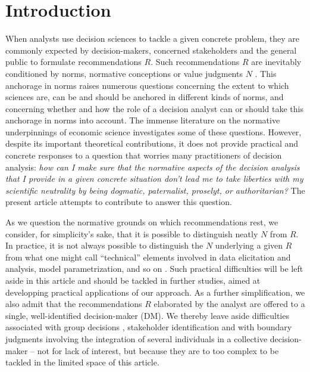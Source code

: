 \documentclass[preprint, french, english, 11pt, authoryear]{elsarticle}%
\begin{document}
\section{Introduction}
When analysts use decision sciences to tackle a given concrete problem, they are commonly expected by decision-makers, concerned stakeholders and the general public to formulate recommendations $R$. 
Such recommendations $R$ are inevitably conditioned by norms, normative conceptions or value judgments $N$ \citep{funtowicz_science_1993,brans_ethics_2002,mingers_ethics_2011,ormerod_operational_2013,diekmann_moral_2013}. This anchorage in norms raises numerous questions concerning the extent to which sciences are, can be and should be anchored in different kinds of norms, and concerning whether and how the role of a decision analyst can or should take this anchorage in norms into account. The immense literature on the normative underpinnings of economic science \citep{buchanan_positive_1959, sen_nature_1967, dwyer_scientific_1985, heath_value_1994, sen_rationality_2004, mongin_value_2006, sen_idea_2009, baujard_value_2013} investigates some of these questions. %
However, despite its important theoretical contributions, it does not provide practical and concrete responses to a question that worries many practitioners of decision analysis: \emph{how can I make sure that the normative aspects of the decision analysis that I provide in a given concrete situation don't lead me to take liberties with my scientific neutrality by being dogmatic, paternalist, proselyt, or authoritarian?}
The present article attempts to contribute to answer this question. 

As we question the normative grounds on which recommendations rest, we consider, for simplicity's sake, that it is possible to distinguish neatly $N$ from $R$. In practice, it is not always possible to distinguish the $N$ underlying a given $R$ from what one might call ``technical'' elements involved in data elicitation and analysis, model parametrization, and so on \citep{baujard_value_2013}. Such practical difficulties will be left aside in this article and should be tackled in further studies, aimed at developping practical applications of our approach. As a further simplification, we also admit that the recommendations $R$ elaborated by the analyst are offered to a single, well-identified decision-maker (\ac{DM}). We thereby leave aside difficulties associated with group decisions \citep{jackson_towards_1984}, stakeholder identification \cite{wang_systemic_2015} and with boundary judgments involving the integration of several individuals in a collective decision-maker \citep{midgley_systemic_2000} -- not for lack of interest, but because they are to too complex to be tackled in the limited space of this article.
\end{document}
